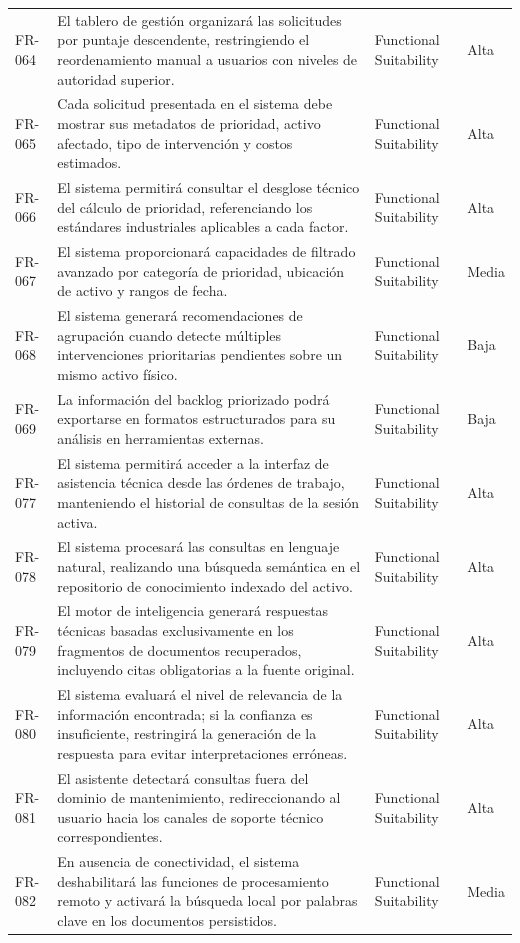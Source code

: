 \begin{longtable}{>{\raggedright\arraybackslash}p{} >{\raggedright\arraybackslash}p{} >{\raggedright\arraybackslash}p{} >{\raggedright\arraybackslash}p{}}
FR-064 & El tablero de gestión organizará las solicitudes por puntaje descendente, restringiendo el reordenamiento manual a usuarios con niveles de autoridad superior. & Functional Suitability & Alta \\
FR-065 & Cada solicitud presentada en el sistema debe mostrar sus metadatos de prioridad, activo afectado, tipo de intervención y costos estimados. & Functional Suitability & Alta \\
FR-066 & El sistema permitirá consultar el desglose técnico del cálculo de prioridad, referenciando los estándares industriales aplicables a cada factor. & Functional Suitability & Alta \\
FR-067 & El sistema proporcionará capacidades de filtrado avanzado por categoría de prioridad, ubicación de activo y rangos de fecha. & Functional Suitability & Media \\
FR-068 & El sistema generará recomendaciones de agrupación cuando detecte múltiples intervenciones prioritarias pendientes sobre un mismo activo físico. & Functional Suitability & Baja \\
FR-069 & La información del backlog priorizado podrá exportarse en formatos estructurados para su análisis en herramientas externas. & Functional Suitability & Baja \\
FR-077 & El sistema permitirá acceder a la interfaz de asistencia técnica desde las órdenes de trabajo, manteniendo el historial de consultas de la sesión activa. & Functional Suitability & Alta \\
FR-078 & El sistema procesará las consultas en lenguaje natural, realizando una búsqueda semántica en el repositorio de conocimiento indexado del activo. & Functional Suitability & Alta \\
FR-079 & El motor de inteligencia generará respuestas técnicas basadas exclusivamente en los fragmentos de documentos recuperados, incluyendo citas obligatorias a la fuente original. & Functional Suitability & Alta \\
FR-080 & El sistema evaluará el nivel de relevancia de la información encontrada; si la confianza es insuficiente, restringirá la generación de la respuesta para evitar interpretaciones erróneas. & Functional Suitability & Alta \\
FR-081 & El asistente detectará consultas fuera del dominio de mantenimiento, redireccionando al usuario hacia los canales de soporte técnico correspondientes. & Functional Suitability & Alta \\
FR-082 & En ausencia de conectividad, el sistema deshabilitará las funciones de procesamiento remoto y activará la búsqueda local por palabras clave en los documentos persistidos. & Functional Suitability & Media \\

\end{longtable}
